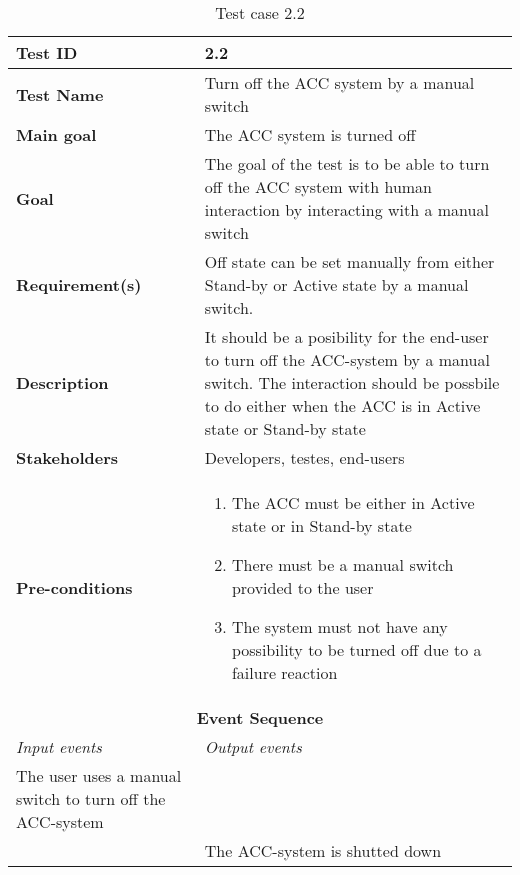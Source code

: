 \begin{table}[H]
\centering
\begin{tabularx}{\linewidth}{X|X}
    \hline
    \textbf{Test ID} & 2.2\\
    \hline
    \textbf{Test Name} & Turn off the ACC system by a manual switch\\
    \hline
    \textbf{Main goal} & The ACC system is turned off \\
    \hline
    \textbf{Goal} & The goal of the test is to be able to turn off the ACC system with human interaction by interacting with a manual switch \\
    \hline
    \textbf{Requirement(s)} & Off state can be set manually from either Stand-by or Active state by a manual switch. \\
    \hline
    \textbf{Description} & It should be a posibility for the end-user to turn off the ACC-system by a manual switch. The interaction should be possbile to do either when the ACC is in Active state or Stand-by state \\
    \hline
    \textbf{Stakeholders} & Developers, testes, end-users \\
    \hline
    \textbf{Pre-conditions} & 
    \begin{enumerate}
        \item The ACC must be either in Active state or in Stand-by state
        \item There must be a manual switch provided to the user
        \item The system must not have any possibility to be turned off due to a failure reaction
    \end{enumerate}\\
    \hline
    \multicolumn{2}{c}{\textbf{Event Sequence}} \\
    \hline
    \textit{Input events} & \textit{Output events} \\
    \hline
    The user uses a manual switch to turn off the ACC-system &  \\
    \hline
     & The ACC-system is shutted down \\
    \hline
\end{tabularx}
\caption{\label{tab_case2_2} Test case 2.2}
\end{table}


